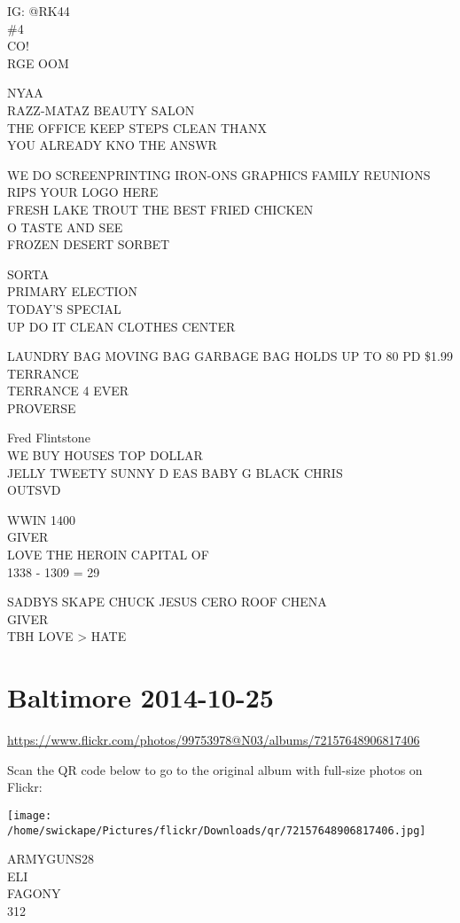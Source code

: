 \documentclass[10pt,letterpaper]{article}
\begin{document}
IG: @RK44\\
\#4\\
CO!\\
RGE OOM

NYAA\\
RAZZ{-}MATAZ BEAUTY SALON\\
THE OFFICE KEEP STEPS CLEAN THANX\\
YOU ALREADY KNO THE ANSWR

WE DO SCREENPRINTING IRON{-}ONS GRAPHICS FAMILY REUNIONS RIPS YOUR LOGO HERE\\
FRESH LAKE TROUT THE BEST FRIED CHICKEN\\
O TASTE AND SEE\\
FROZEN DESERT SORBET

SORTA\\
PRIMARY ELECTION\\
TODAY'S SPECIAL\\
UP DO IT CLEAN CLOTHES CENTER

LAUNDRY BAG MOVING BAG GARBAGE BAG HOLDS UP TO 80 PD \$1.99\\
TERRANCE\\
TERRANCE 4 EVER\\
PROVERSE

Fred Flintstone\\
WE BUY HOUSES TOP DOLLAR\\
JELLY TWEETY SUNNY D EAS BABY G BLACK CHRIS\\
OUTSVD

WWIN 1400\\
GIVER\\
LOVE THE HEROIN CAPITAL OF\\
1338 {-} 1309 = 29

SADBYS SKAPE CHUCK JESUS CERO ROOF CHENA\\
GIVER\\
TBH LOVE > HATE


\section*{Baltimore 2014-10-25}

\url{https://www.flickr.com/photos/99753978@N03/albums/72157648906817406}

Scan the QR code below to go to the original album with full-size photos on Flickr:

\texttt{[image: /home/swickape/Pictures/flickr/Downloads/qr/72157648906817406.jpg]}


ARMYGUNS28\\
ELI\\
FAGONY\\
312
\end{document}
